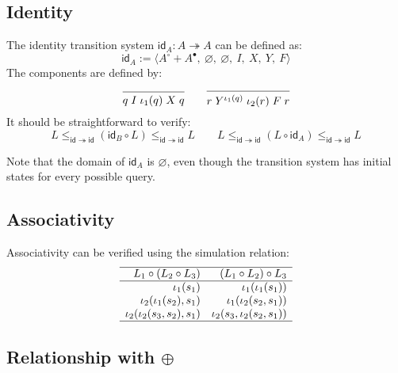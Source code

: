 \documentclass{article}
\begin{document}

\subsection{Identity} %

The identity transition system $\mathsf{id}_A : A \twoheadrightarrow A$
can be defined as:
\[
  \mathsf{id}_A :=
    \langle A^\circ + A^\bullet,\: \varnothing,\: \varnothing,\: I,\: X,\: Y,\: F \rangle
\]
The components are defined by:
\[
  \begin{prooftree}
    \infer0{q \mathrel{I} \iota_1(q) \mathrel{X} q}
  \end{prooftree}
  \qquad
  \begin{prooftree}
    \infer0{r \mathrel{Y^{\iota_1(q)}} \iota_2(r) \mathrel{F} r}
  \end{prooftree}
\]
It should be straightforward to verify:
\[
  L
  \le_{\mathsf{id} \twoheadrightarrow \mathsf{id}}
  (\mathsf{id}_B \circ L)
  \le_{\mathsf{id} \twoheadrightarrow \mathsf{id}}
  L
  \qquad
  L
  \le_{\mathsf{id} \twoheadrightarrow \mathsf{id}}
  (L \circ \mathsf{id}_A)
  \le_{\mathsf{id} \twoheadrightarrow \mathsf{id}}
  L
\]

Note that the domain of $\mathsf{id}_A$ is $\varnothing$,
even though the transition system has initial states
for every possible query.


\subsection{Associativity} %

Associativity can be verified using
the simulation relation:
\[
  \begin{array}{rr}
    \hline
    L_1 \circ (L_2 \circ L_3) & (L_1 \circ L_2) \circ L_3 \\
    \hline
    \iota_1(s_1) & \iota_1(\iota_1(s_1)) \\
    \iota_2(\iota_1(s_2), s_1) & \iota_1(\iota_2(s_2, s_1)) \\
    \iota_2(\iota_2(s_3, s_2), s_1) & \iota_2(s_3, \iota_2(s_2, s_1)) \\
    \hline
  \end{array}
\]


\subsection{Relationship with $\oplus$} %
\end{document}

